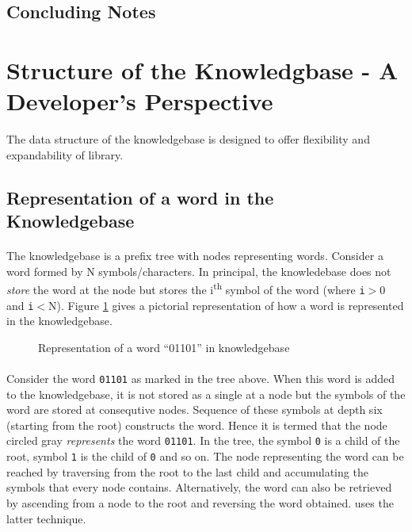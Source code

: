 \subsection*{Concluding Notes}


\section{Structure of the Knowledgbase - A Developer's Perspective}
The data structure of the knowledgebase is designed to offer flexibility and expandability of \libalf library. 

\subsection{Representation of a word in the Knowledgebase}
\paragraph{}
The knowledgebase is a prefix tree with nodes representing words. Consider a word formed by N symbols/characters. In principal, the knowledebase does not \emph{store} the word at the node but stores the i\textsuperscript{th} symbol of the word (where \texttt{i}$>$0 and \texttt{i}$<$N). Figure \ref{knowledgebasepic} gives a pictorial representation of how a word is represented in the knowledgebase.


\begin{figure} [h]
\centering
{}
\caption{Representation of a word ``01101'' in knowledgebase}
\label{knowledgebasepic}
\end{figure}


\paragraph{}	
Consider the word \texttt{01101} as marked in the tree above. When this word is added to the knowledgebase, it is not stored as a single \stringtype at a node but the symbols of the word are stored at consequtive nodes. Sequence of these symbols at depth six (starting from the root) constructs the word. Hence it is termed that the node circled gray \emph{represents} the word \texttt{01101}. In the tree, the symbol \texttt{0} is a child of the root, symbol \texttt{1} is the child of \texttt{0} and so on. The node representing the word can be reached by traversing from the root to the last child and accumulating the symbols that every node contains. Alternatively, the word can also be retrieved by ascending from a node to the root and reversing the word obtained. \libalf uses the latter technique. 
\vskip 1pt
	
